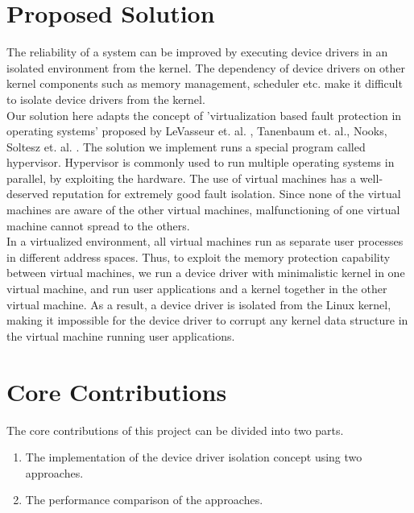 \pagebreak
  
\section {Proposed Solution} 

The reliability of a system can be improved by executing device drivers in an isolated environment from the kernel. The dependency of device drivers on other kernel components such as memory management, scheduler etc. make it difficult to isolate device drivers from the kernel.
\\
Our solution here adapts the concept of 'virtualization  based fault protection in operating systems' proposed by LeVasseur et. al. \cite{LeVasseur04UnmodifiedDriverReuse}, Tanenbaum et. al.\cite{Tanenbaum06canwe}, Nooks\cite{Swift:2002:NAR:1133373.1133393}, Soltesz et. al. \cite{Soltesz:2007:COS:1272998.1273025}. The solution we implement runs a special program called hypervisor. Hypervisor is commonly used to run multiple operating systems in parallel, by exploiting the hardware. The use of virtual machines has a well-deserved reputation for extremely good fault isolation. Since none of the virtual machines are aware of the other virtual machines, malfunctioning of one virtual machine cannot spread to the others.
\\
In a virtualized environment, all virtual machines run as separate user processes in different address spaces. Thus, to exploit the memory protection capability between virtual machines, we run a device driver with minimalistic kernel in one virtual machine, and run user applications and a kernel together in the other virtual machine. As a result, a device driver is isolated from the Linux kernel, making it impossible for the device driver to corrupt any kernel data structure in the virtual machine running user applications. 

\pagebreak

\section{Core Contributions}

The core contributions of this project can be divided into two parts. 

\begin{enumerate}
\item The implementation of the device driver isolation concept using two approaches. 
\item The performance comparison of the approaches.
\end{enumerate}

